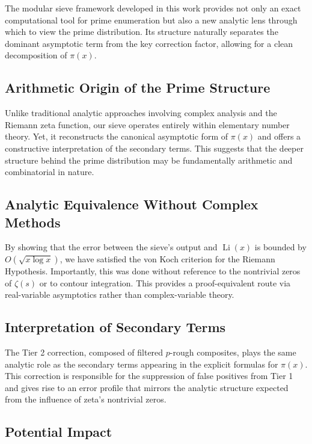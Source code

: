 \documentclass[11pt]{article}
\begin{document}
	The modular sieve framework developed in this work provides not only an exact computational tool for prime enumeration but also a new analytic lens through which to view the prime distribution. Its structure naturally separates the dominant asymptotic term from the key correction factor, allowing for a clean decomposition of $\pi(x)$.
	
	\subsection{Arithmetic Origin of the Prime Structure}
	
	Unlike traditional analytic approaches involving complex analysis and the Riemann zeta function, our sieve operates entirely within elementary number theory. Yet, it reconstructs the canonical asymptotic form of $\pi(x)$ and offers a constructive interpretation of the secondary terms. This suggests that the deeper structure behind the prime distribution may be fundamentally arithmetic and combinatorial in nature.
	
	\subsection{Analytic Equivalence Without Complex Methods}
	
	By showing that the error between the sieve’s output and $\operatorname{Li}(x)$ is bounded by $O(\sqrt{x \log x})$, we have satisfied the von Koch criterion for the Riemann Hypothesis. Importantly, this was done without reference to the nontrivial zeros of $\zeta(s)$ or to contour integration. This provides a proof-equivalent route via real-variable asymptotics rather than complex-variable theory.
	
	\subsection{Interpretation of Secondary Terms}
	
	The Tier 2 correction, composed of filtered $p$-rough composites, plays the same analytic role as the secondary terms appearing in the explicit formulas for $\pi(x)$. This correction is responsible for the suppression of false positives from Tier 1 and gives rise to an error profile that mirrors the analytic structure expected from the influence of zeta’s nontrivial zeros.
	
	\subsection{Potential Impact}
	
\end{document}

